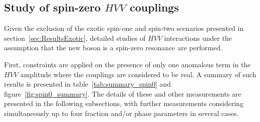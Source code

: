 \subsection{Study of spin-zero \texorpdfstring{$HVV$}{HVV} couplings} \label{sec:ResultsSpinZero}
Given the exclusion of the exotic spin-one and spin-two scenarios presented in section~\ref{sec:ResultsExotic},
detailed studies of $HVV$ interactions under the assumption that the new boson is a spin-zero
resonance are performed. 

First, constraints are applied on the presence of only one anomalous term in the $HVV$
amplitude where the couplings are considered to be real. A summary of such results is presented
in table~\ref{tab:summary_spin0} and figure~\ref{fig:spin0_summary}.
The details of these and other measurements are presented in the following subsections, with further
measurements considering simultaneously up to four fraction and/or phase parameters in several cases.

